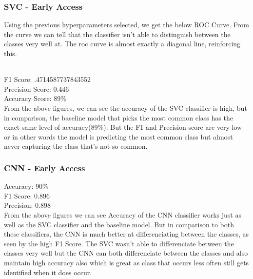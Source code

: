 \documentclass[11pt]{article} %
\begin{document}
\subsubsection{SVC - Early Access}
Using the previous hyperparameters selected, we get the below ROC Curve. From the curve we can tell that the classifier isn't able to distinguish between the classes very well at. The roc curve is almost exactly a diagonal line, reinforcing this.
\begin{figure}[ht]
\centering
{}
\qquad
\end{figure}
\\F1 Score:  .4714587737843552
\\Precision Score:  0.446
\\Accuracy Score:  89\%
\\ From the above figures, we can see the accuracy of the SVC classifier is high, but in comparison, the baseline model that picks the most common class has the exact same level of accuracy(89\%). But the F1 and Precision score are very low or in other words the model is predicting the most common class but almost never capturing the class that's not so common.
\subsubsection{CNN - Early Access}
Accuracy:  90\%
\\ F1 Score: 0.896
\\Precision: 0.898
\\ From the above figures we can see Accuracy of the CNN classifier works just as well as the SVC classifier and the baseline model. But in comparison to both these classifiers, the CNN is much better at differenciating between the classes, as seen by the high F1 Score. The SVC wasn't able to differenciate between the classes very well but the CNN can both differenciate between the classes and also maintain high accuracy also which is great as class that occurs less often still gets identified when it does occur. 
\end{document}
